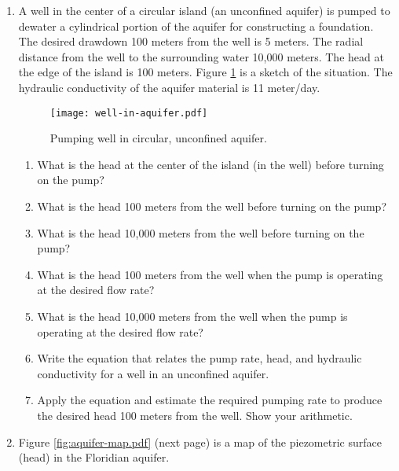 \documentclass[12pt]{article}
\begin{document}
\begin{enumerate}
\begin{enumerate}
\end{enumerate}
\clearpage
\item A well in the center of a circular island (an unconfined aquifer) is pumped to dewater a cylindrical portion of the aquifer for constructing a foundation.   The desired drawdown 100 meters from the well is 5 meters.   The radial distance from the well to the surrounding water 10,000 meters.  The head at the edge of the island is 100 meters.  Figure \ref{fig:well-in-aquifer.pdf} is a sketch of the situation.   The hydraulic conductivity of the aquifer material is 11 meter/day. 
\begin{figure}[h!] %
   \centering
   \texttt{[image: well-in-aquifer.pdf]} 
   \caption{Pumping well in circular, unconfined aquifer.}
   \label{fig:well-in-aquifer.pdf}
\end{figure}
\begin{enumerate}
\item What is the head at the center of the island (in the well) before turning on the pump?
\item What is the head 100 meters from the well before turning on the pump?
\item What is the head 10,000 meters from the well before turning on the pump?
\item What is the head 100 meters from the well when the pump is operating at the desired flow rate?
\item What is the head 10,000 meters from the well when the pump is operating at the desired flow rate?
\item Write the equation that relates the pump rate, head, and hydraulic conductivity for a well in an unconfined aquifer.
\item Apply the equation and estimate the required pumping rate to produce the desired head 100 meters from the well.   Show your arithmetic.
\end{enumerate}
\clearpage
\item Figure \ref{fig:aquifer-map.pdf} (next page) is a map of the piezometric surface (head) in the Floridian aquifer.  


\end{enumerate}
\end{document}
